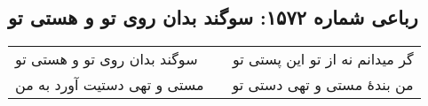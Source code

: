 \begin{center}
\section*{رباعی شماره ۱۵۷۲: سوگند بدان روی تو و هستی تو}
\label{sec:1572}
\begin{longtable}{l p{0.5cm} r}
سوگند بدان روی تو و هستی تو
&&
گر میدانم نه از تو این پستی تو
\\
مستی و تهی دستیت آورد به من
&&
من بندهٔ مستی و تهی دستی تو
\\
\end{longtable}
\end{center}
